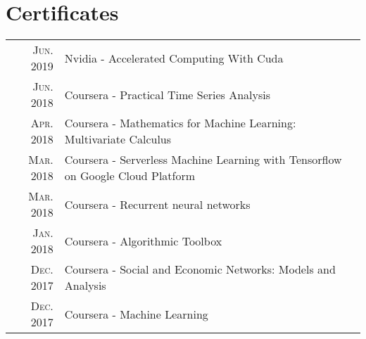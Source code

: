 \documentclass[a4paper,10pt]{article}
\begin{document}
\section{Certificates}
\begin{tabular}{rl}
	\textsc{Jun.} 2019 & Nvidia - Accelerated Computing With Cuda \\
    \textsc{Jun.} 2018 & Coursera - Practical Time Series Analysis \\
    \textsc{Apr.} 2018 & Coursera - Mathematics for Machine Learning: Multivariate Calculus \\
    \textsc{Mar.} 2018 & Coursera - Serverless Machine Learning with Tensorflow on Google Cloud Platform \\
    \textsc{Mar.} 2018 & Coursera - Recurrent neural networks \\
    \textsc{Jan.} 2018 & Coursera - Algorithmic Toolbox \\
    \textsc{Dec.} 2017 & Coursera - Social and Economic Networks: Models and Analysis \\
    \textsc{Dec.} 2017 & Coursera - Machine Learning \\
\end{tabular}
    

		
\end{document}
